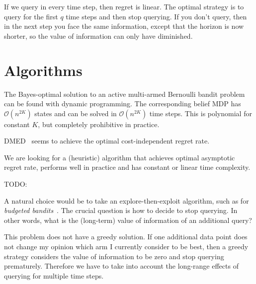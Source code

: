\documentclass[a4paper]{article}
\begin{document}


If we query in every time step, then regret is linear.
The optimal strategy is to query for the first $q$ time steps and then stop querying.
If you don't query, then in the next step you face the same information, except that the horizon is now shorter,
so the value of information can only have diminished.



\section{Algorithms}

The Bayes-optimal solution to an active multi-armed Bernoulli bandit problem can be found with dynamic programming.
The corresponding belief MDP has $\mathcal{O}(n^{2K})$ states
and can be solved in $\mathcal{O}(n^{2K})$ time steps.
This is polynomial for constant $K$,
but completely prohibitive in practice.

DMED~\citep{Honda10} seems to achieve the optimal cost-independent regret rate.

We are looking for a (heuristic) algorithm that achieves optimal asymptotic regret rate, performs well in practice and has constant or linear time complexity.

TODO: \citet{Bubeck11}

A natural choice would be to take an explore-then-exploit algorithm, such as for \emph{budgeted bandits}~\citep{Madani04}.
The crucial question is how to decide to stop querying.
In other words, what is the (long-term) value of information of an additional query?

This problem does not have a greedy solution.
If one additional data point does not change my opinion
which arm I currently consider to be best,
then a greedy strategy considers the value of information to be zero and stop querying prematurely.
Therefore we have to take into account the long-range effects of querying for multiple time steps.
\end{document}
